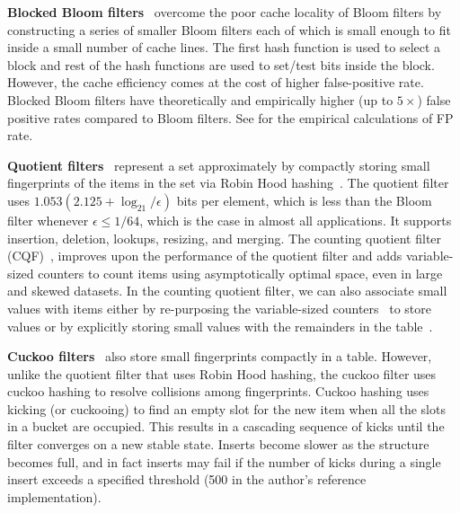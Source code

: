 \textbf{Blocked Bloom filters}~\cite{putze2007cache} overcome the poor cache locality of Bloom filters by constructing a series of smaller Bloom filters each of which is small enough to fit inside a small number of cache lines. The first hash function is used to select a block and rest of the hash functions are used to set/test bits inside the block. However, the cache efficiency comes at the cost of higher false-positive rate. Blocked Bloom filters have theoretically and empirically higher (up to $5\times$) false positive rates compared to Bloom filters. See  for the empirical calculations of FP rate.

\textbf{Quotient filters}~\cite{Cleary84,PaghPaRa05,DillingerMa09,BenderFaJo12a,PandeyBJP17,pandeySigmod21} represent a set approximately by compactly storing small fingerprints of the items in the set via Robin Hood hashing~\cite{CelisLaMu85}. The quotient filter uses $1.053 (2.125 + \log_21/\epsilon)$ bits per element, which is less than the Bloom filter whenever $\epsilon \leq 1/64$, which is the case in almost all applications. It supports insertion, deletion, lookups, resizing, and merging. The counting quotient filter (CQF)~\cite{PandeyBJP17}, improves upon the performance of the quotient filter and adds variable-sized counters to count items using asymptotically optimal space, even in large and skewed datasets. In the counting quotient filter, we can also associate small values with items either by re-purposing the variable-sized counters~\cite{PandeyABFJP18Cell} to store values or by explicitly storing small values with the remainders in the table~\cite{PandeySMB20}.

\textbf{Cuckoo filters}~\cite{FanAnKa14,BreslowJ18} also store small fingerprints compactly in a table. However, unlike the quotient filter that uses Robin Hood hashing, the cuckoo filter uses cuckoo hashing to resolve collisions among fingerprints. Cuckoo hashing uses kicking (or cuckooing) to find an empty slot for the new item when all the slots in a bucket are occupied. This results in a cascading sequence of kicks until the filter converges on a new stable state. Inserts become slower as the structure becomes full, and in fact inserts may fail if the number of kicks during a single insert exceeds a specified threshold (500 in the author's reference implementation). 

